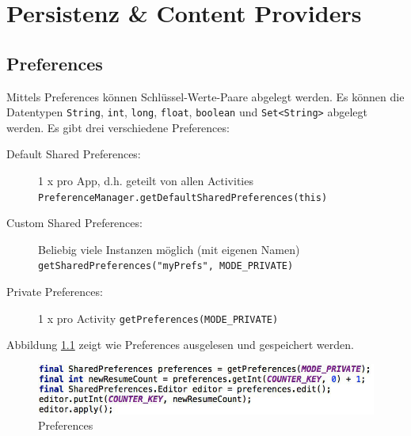 \chapter{Persistenz \& Content Providers}

\section{Preferences}

Mittels Preferences können Schlüssel-Werte-Paare abgelegt werden. Es können die Datentypen \texttt{String}, \texttt{int}, \texttt{long}, \texttt{float}, \texttt{boolean} und \texttt{Set<String>} abgelegt werden. Es gibt drei verschiedene Preferences:
\begin{description}
	\item[Default Shared Preferences:] 1 x pro App, d.h. geteilt von allen Activities \\ \texttt{PreferenceManager.getDefaultSharedPreferences(this)}
	\item[Custom Shared Preferences:] Beliebig viele Instanzen möglich (mit eigenen Namen) \\ \texttt{getSharedPreferences("myPrefs", MODE\_PRIVATE)}
	\item[Private Preferences:] 1 x pro Activity \texttt{getPreferences(MODE\_PRIVATE)}
\end{description}
Abbildung \ref{fig:preferences} zeigt wie Preferences ausgelesen und gespeichert werden.
\begin{figure}
\centering
\includegraphics[width=\linewidth]{fig/preferences}
\caption{Preferences}
\label{fig:preferences}
\end{figure}

